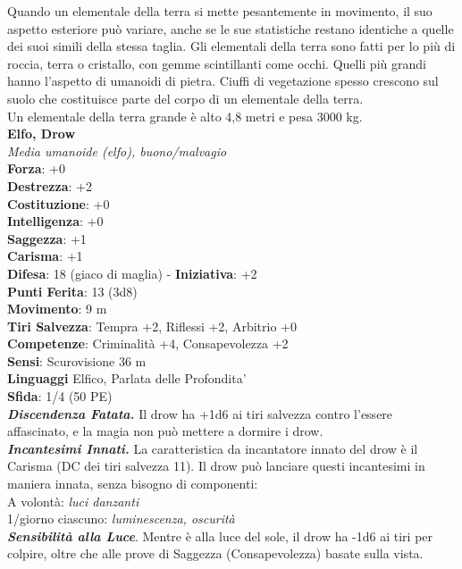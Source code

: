 \begin{multicols}{2}
Quando un elementale della terra si mette pesantemente in movimento, il suo aspetto esteriore può variare, anche se le sue statistiche restano identiche a quelle dei suoi simili della stessa taglia. Gli elementali della terra sono fatti per lo più di roccia, terra o cristallo, con gemme scintillanti come occhi. Quelli più grandi hanno l'aspetto di umanoidi di pietra. Ciuffi di vegetazione spesso crescono sul suolo che costituisce parte del corpo di un elementale della terra.\\

Un elementale della terra grande è alto 4,8 metri e pesa 3000 kg.\\

\medskip\textbf{Elfo, Drow}\\
\emph{Media umanoide (elfo), buono/malvagio}\\
\textbf{Forza}: +0\\
\textbf{Destrezza}: +2\\
\textbf{Costituzione}: +0\\
\textbf{Intelligenza}: +0\\
\textbf{Saggezza}: +1\\
\textbf{Carisma}: +1\\
\textbf{Difesa}: 18 (giaco di maglia) - \textbf{Iniziativa}: +2\\
\textbf{Punti Ferita}: 13 (3d8)\\
\textbf{Movimento}: 9 m\\
\textbf{Tiri Salvezza}: Tempra +2, Riflessi +2, Arbitrio +0\\
\textbf{Competenze}: Criminalità +4, Consapevolezza +2\\
\textbf{Sensi}: Scurovisione 36 m\\
\textbf{Linguaggi} Elfico, Parlata delle Profondita'\\
\textbf{Sfida}: 1/4 (50 PE)\smallskip\\
\emph{\textbf{Discendenza Fatata.}} Il drow ha +1d6 ai tiri salvezza contro l'essere affascinato, e la magia non può mettere a dormire i drow.\\
\emph{\textbf{Incantesimi Innati.}} La caratteristica da incantatore innato del drow è il Carisma (DC dei tiri salvezza 11). Il drow può lanciare questi incantesimi in maniera innata, senza bisogno di componenti:\\
A volontà: \emph{luci danzanti}\\
1/giorno ciascuno: \emph{luminescenza, oscurità}\\
\emph{\textbf{Sensibilità alla Luce}}. Mentre è alla luce del sole, il drow ha -1d6 ai tiri per colpire, oltre che alle prove di Saggezza (Consapevolezza) basate sulla vista.\\

\end{multicols}
